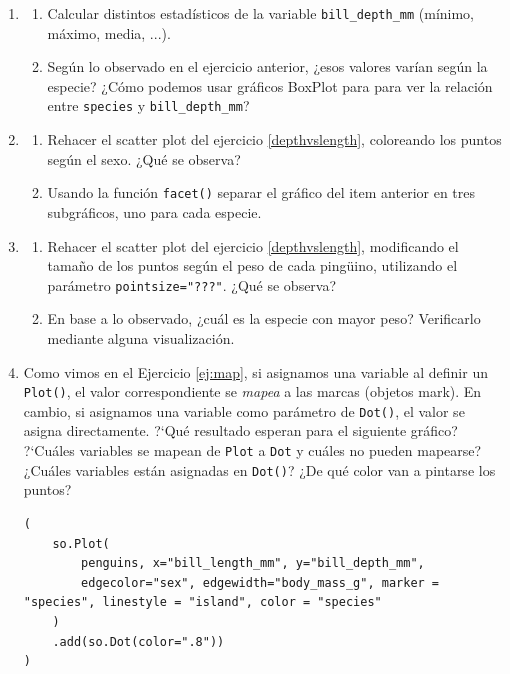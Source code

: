 \documentclass[a4paper,11pt]{article}
\theoremstyle{definition}
\begin{document}
\begin{enumerate}[resume]
\item \begin{enumerate}
\item Calcular distintos estadísticos de la variable \lstinline{bill_depth_mm} (mínimo, máximo, media, ...).
\item Según lo observado en el ejercicio anterior, ¿esos valores varían según la especie? ¿Cómo podemos usar gráficos BoxPlot para para ver la relaci\'on entre \lstinline{species} y \lstinline{bill_depth_mm}?
\end{enumerate}

\item
\begin{enumerate}
\item Rehacer el scatter plot del ejercicio \ref{depthvslength}, coloreando los puntos según el sexo. ¿Qué se observa?
\item Usando la función \lstinline{facet()} separar el gráfico del item anterior en tres subgráficos, uno para cada especie.
\end{enumerate}

\item 
\begin{enumerate}
\item Rehacer el scatter plot del ejercicio \ref{depthvslength}, modificando el tamaño de los puntos según el peso de cada pingüino, utilizando el parámetro \lstinline{pointsize="???"}. ¿Qué se observa?
\item En base a lo observado, ¿cuál es la especie con mayor peso? Verificarlo mediante alguna visualización.
\end{enumerate}

\item 
Como vimos en el Ejercicio \ref{ej:map}, si asignamos una variable al definir un \lstinline{Plot()}, el valor correspondiente se \emph{mapea} a las marcas (objetos mark). En cambio, si asignamos una variable como parámetro de \lstinline{Dot()}, el valor se asigna directamente. ?`Qu\'e resultado esperan para el siguiente gráfico? ?`Cu\'ales variables se mapean de \lstinline{Plot} a \lstinline{Dot} y cuáles no pueden mapearse? ¿Cuáles variables están asignadas en \lstinline{Dot()}? ¿De qué color van a pintarse los puntos?

\begin{lstlisting}
(
    so.Plot(
        penguins, x="bill_length_mm", y="bill_depth_mm",
        edgecolor="sex", edgewidth="body_mass_g", marker = "species", linestyle = "island", color = "species"
    )
    .add(so.Dot(color=".8"))
)
\end{lstlisting}

\end{enumerate}
\end{document}
